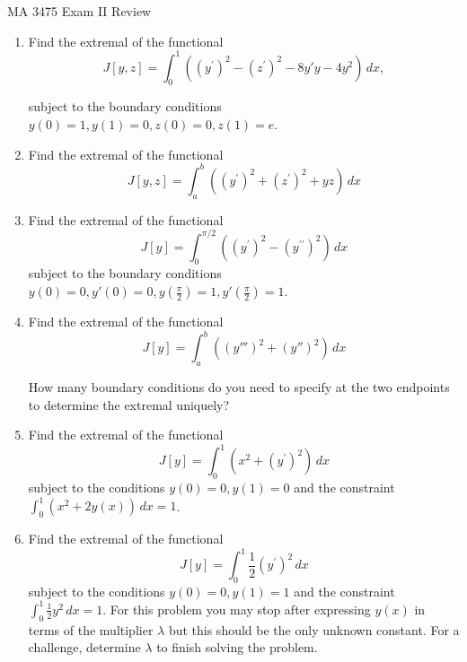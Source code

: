 \documentclass[12pt]{article}
\begin{document}
\noindent MA 3475\,\,Exam II Review 


\begin{enumerate}
\item Find the extremal of the functional
$$
J[y,z] = \int_0^1 \left((y^{\prime})^2 - (z^{\prime})^2 - 8y'y -4 y^2 \right)\,dx,
$$

subject to the boundary conditions $y(0) = 1, y(1)=  0, z(0) = 0, z(1) = e$.

\item Find the extremal of the functional
$$
J[y,z] = \int_a^b \left((y^{\prime})^2 + (z^{\prime})^2 + y z \right)\,dx
$$


\item Find the extremal of the functional
$$
J[y] = \int_0^{\pi/2} \left((y^{\prime})^2 - (y^{\prime\prime})^2 \right) \,dx
$$
subject to the boundary conditions $y(0) = 0, y'(0) = 0, y\left(\frac{\pi}{2}\right) = 1, y'\left(\frac{\pi}{2}\right) = 1$.


\item Find the extremal of the functional
$$
J[y] = \int_a ^b \left((y''')^2  + (y'')^2  \right)\,dx
$$

How many boundary conditions do you need to specify at the two endpoints to determine the extremal uniquely?

\item Find the extremal of the functional
$$
J[y] = \int_0^1 \left( x^2 + (y^{\prime})^2 \right) \,dx
$$
subject to the conditions $y(0) = 0, y(1) = 0$ and the constraint $\int_0^1 \left( x^2 + 2 y(x) \right)\,dx = 1$.


\item Find the extremal of the functional
$$
J[y] = \int_0^1 \frac{1}{2} (y^{\prime})^2 \,dx
$$
subject to the conditions $y(0) = 0, y(1) = 1$ and the constraint $\int_0^1 \frac{1}{2}y^2 \,dx = 1$. For this problem   you may stop after expressing $y(x)$ in terms of the multiplier $\lambda$ but this should be the only unknown constant. For a challenge, determine $\lambda$ to finish solving the problem.

\end{enumerate}
\end{document}
